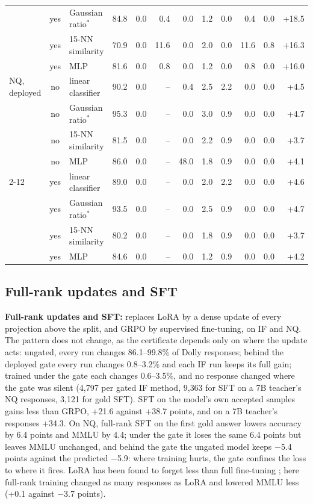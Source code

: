 \documentclass{article}
\theoremstyle{plain}
\theoremstyle{definition}
\theoremstyle{remark}
\begin{document}
\begin{table}[t]
\begin{tabular}{l c l r rr rrr rr r}
 & yes & Gaussian ratio$^\ast$ & 84.8 & 0.0 & 0.4 & 0.0 & 1.2 & 0.0 & 0.4 & 0.0 & +18.5 \\
 & yes & 15-NN similarity & 70.9 & 0.0 & 11.6 & 0.0 & 2.0 & 0.0 & 11.6 & 0.8 & +16.3 \\
 & yes & MLP & 81.6 & 0.0 & 0.8 & 0.0 & 1.2 & 0.0 & 0.8 & 0.0 & +16.0 \\
\midrule
NQ, deployed & no & linear classifier & 90.2 & 0.0 & -- & 0.4 & 2.5 & 2.2 & 0.0 & 0.0 & +4.5 \\
 & no & Gaussian ratio$^\ast$ & 95.3 & 0.0 & -- & 0.0 & 3.0 & 0.9 & 0.0 & 0.0 & +4.7 \\
 & no & 15-NN similarity & 81.5 & 0.0 & -- & 0.0 & 2.2 & 0.9 & 0.0 & 0.0 & +3.7 \\
 & no & MLP & 86.0 & 0.0 & -- & 48.0 & 1.8 & 0.9 & 0.0 & 0.0 & +4.1 \\
\cmidrule(lr){2-12}
 & yes & linear classifier & 89.0 & 0.0 & -- & 0.0 & 2.0 & 2.2 & 0.0 & 0.0 & +4.6 \\
 & yes & Gaussian ratio$^\ast$ & 93.5 & 0.0 & -- & 0.0 & 2.5 & 0.9 & 0.0 & 0.0 & +4.7 \\
 & yes & 15-NN similarity & 80.2 & 0.0 & -- & 0.0 & 1.8 & 0.9 & 0.0 & 0.0 & +3.7 \\
 & yes & MLP & 84.6 & 0.0 & -- & 0.0 & 1.2 & 0.9 & 0.0 & 0.0 & +4.2 \\
\bottomrule
\end{tabular}
\end{table}

\subsection{Full-rank updates and SFT}
\label{app:res-other}

\textbf{Full-rank updates and SFT:}  replaces LoRA by a dense update of every projection above the
split, and GRPO by supervised fine-tuning, on IF and NQ. The pattern does not change, as the certificate depends only
on where the update acts: ungated, every run changes 86.1--99.8\% of Dolly responses; behind the deployed gate every
run changes 0.8--3.2\% and each IF run keeps its full gain; trained under the gate each changes 0.6--3.5\%, and no
response changed where the gate was silent (4{,}797 per gated IF method, 9{,}363 for SFT on a 7B teacher's NQ
responses, 3{,}121 for gold SFT). SFT on the model's own accepted samples gains less than GRPO, +21.6 against +38.7
points, and on a 7B teacher's responses +34.3. On NQ, full-rank SFT on the first gold answer lowers accuracy by 6.4
points and MMLU by 4.4; under the gate it loses the same 6.4 points but leaves MMLU unchanged, and behind the gate the
ungated model keeps $-$5.4 points against the predicted $-$5.9: where training hurts, the gate confines the loss to
where it fires. LoRA has been found to forget less than full fine-tuning \citep{biderman2024lora}; here full-rank
training changed as many responses as LoRA and lowered MMLU less (+0.1 against $-$3.7 points).
\end{document}
